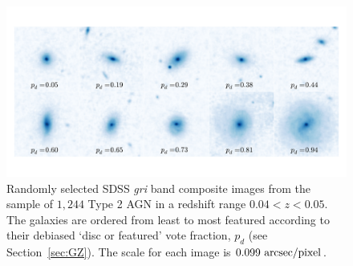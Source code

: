 \begin{figure}[t]
\includegraphics[width=\textwidth]{agn/fig1.pdf}
\caption[SDSS images of galaxies in the \textsc{agn-host} sample]{Randomly selected SDSS \emph{gri} band composite images from the sample of $1,244$ Type 2 AGN in a redshift range $0.04 < z < 0.05$.  The galaxies are ordered from least to most featured according to their debiased `disc or featured' vote fraction, $p_d$ (see Section~\ref{sec:GZ}). The scale for each image is $0.099~\rm{arcsec/pixel}$.}
\label{mosaic}
\end{figure}




